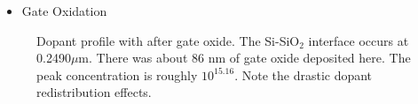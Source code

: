\documentclass{article}
\begin{document}
\begin{description}[style = nextline]
\begin{itemize} 
\item Gate Oxidation 
\end{itemize}
\begin{figure}[H]
\centering
{}
\caption{Dopant profile with after gate oxide. The Si-Si$\text{O}_2$ interface occurs at 0.2490$\mu$m. There was about 86 nm of gate oxide deposited here. The peak concentration is roughly ${10}^{15.16}$. Note the drastic dopant redistribution effects.}
\label{fig:doping2}
\end{figure}


\end{description}
\end{document}
